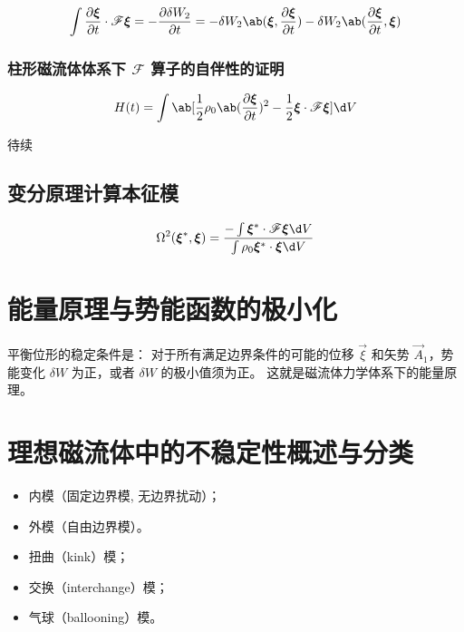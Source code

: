 \begin{equation}
\int \pdv{\vec{\xi}}{t} \cdot \mathscr{F} \vec{\xi}
= - \pdv{\delta W_2}{t}
= - \delta W_2\ab(\vec{\xi}, \pdv{\vec{\xi}}{t})
- \delta W_2\ab(\pdv{\vec{\xi}}{t}, \vec{\xi})
\end{equation}

\subsubsection{柱形磁流体体系下 \texorpdfstring{$\mathscr{F}$}{F} 算子的自伴性的证明}

\begin{equation}
H(t) = \int \ab[
    \frac12 \rho_0 \ab(\pdv{\vec{\xi}}{t})^2
    - \frac12 \vec{\xi} \cdot \mathscr{F} \vec{\xi}
] \d V
\end{equation}

待续

\subsection{变分原理计算本征模}

\begin{equation}
\Omega^2(\vec{\xi}^*, \vec{\xi})
= \dfrac{
    - \int \vec{\xi}^* \cdot \mathscr{F} \vec{\xi} \d V
}{
    \int \rho_0 \vec{\xi}^* \cdot \vec{\xi} \d V
}
\end{equation}

\section{能量原理与势能函数的极小化}

平衡位形的稳定条件是：
对于所有满足边界条件的可能的位移 $\vec{\xi}$ 和矢势 $\vec{A}_1$，势能变化 $\delta W$ 为正，或者 $\delta W$ 的极小值须为正。
这就是磁流体力学体系下的能量原理。

\section{理想磁流体中的不稳定性概述与分类}

\begin{itemize}
    \item 内模（固定边界模, 无边界扰动）；
    \item 外模（自由边界模）。
\end{itemize}

\begin{itemize}
    \item 扭曲（kink）模；
    \item 交换（interchange）模；
    \item 气球（ballooning）模。
\end{itemize}

